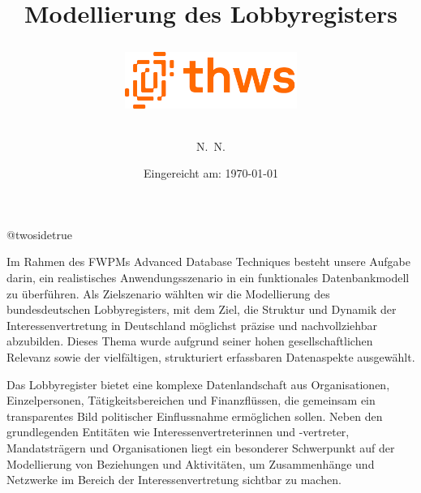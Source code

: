 \documentclass[12pt,twoside=false,a4paper,parskip]{scrbook}
\makeatletter
\def\BaAuthor{Noah Raupold (5022097),\\ David Gläsle()}
\def\BaAuthorStudyProgram{Informatik} %
\def\BaType{ADT Portfolio} %
\def\BaTitle{Modellierung des Lobbyregisters}
\def\BaDeadline{\today}
\def\ShowBaAuthor{\BaAuthor}
\def\ShowBaAuthor{N.~N.}
\newcommand*{\forcetwosidetitle}{
 \begingroup
   \cleardoubleoddpage
   \KOMAoptions{titlepage=true}%
   \csname @twosidetrue\endcsname
  \maketitle
 \endgroup
}
\renewcommand*{\chapter}{\secdef\@chapter\@schapter}
\makeatother
\begin{document}
\frontmatter
\titlehead{
{Technische Hochschule Würzburg-Schweinfurt\\
Fakultät Informatik und Wirtschaftsinformatik}}
\subject{\BaType}
\title{\BaTitle\\[15mm]
\begin{figure}[H]
\centering
\includegraphics[width=0.5\textwidth]{Logo.png}
\label{fig:logo}
\end{figure}}
\author{\ShowBaAuthor}
\date{\normalsize{Eingereicht am: \BaDeadline}}
\forcetwosidetitle


\newpage
\setcounter{secnumdepth}{4}
\setcounter{tocdepth}{4}
\tableofcontents



\mainmatter
\mainmatter

\chapter{Einleitung}
Im Rahmen des FWPMs Advanced Database Techniques besteht unsere Aufgabe darin, ein realistisches Anwendungsszenario in ein funktionales Datenbankmodell zu überführen. Als Zielszenario wählten wir die Modellierung des bundesdeutschen Lobbyregisters, mit dem Ziel, die Struktur und Dynamik der Interessenvertretung in Deutschland möglichst präzise und nachvollziehbar abzubilden. Dieses Thema wurde aufgrund seiner hohen gesellschaftlichen Relevanz sowie der vielfältigen, strukturiert erfassbaren Datenaspekte ausgewählt.

Das Lobbyregister bietet eine komplexe Datenlandschaft aus Organisationen, Einzelpersonen, Tätigkeitsbereichen und Finanzflüssen, die gemeinsam ein transparentes Bild politischer Einflussnahme ermöglichen sollen. Neben den grundlegenden Entitäten wie Interessenvertreterinnen und -vertreter, Mandatsträgern und Organisationen liegt ein besonderer Schwerpunkt auf der Modellierung von Beziehungen und Aktivitäten, um Zusammenhänge und Netzwerke im Bereich der Interessenvertretung sichtbar zu machen.
\end{document}
